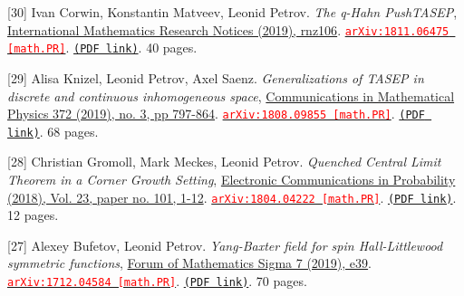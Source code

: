 \begin{etaremune}
\item[{[30]}] 
Ivan Corwin, Konstantin Matveev, Leonid Petrov.
\emph{The q-Hahn PushTASEP}, \href{https://doi.org/10.1093/imrn/rnz106}{International Mathematics Research Notices (2019),  rnz106}. 
\href{https://arxiv.org/abs/1811.06475}{\texttt{{\textcolor{red}{arXiv:1811.06475 [math.PR]}}}}. \href{https://storage.lpetrov.cc/papers/30-the_qhahn_pushtasep.pdf}{\texttt{(PDF link)}}. 40 pages.





\item[{[29]}] 
Alisa Knizel, Leonid Petrov, Axel Saenz.
\emph{Generalizations of TASEP in discrete and continuous inhomogeneous space}, \href{https://link.springer.com/article/10.1007%2Fs00220-019-03495-4}{Communications in Mathematical Physics 372 (2019), no. 3, pp 797-864}. 
\href{https://arxiv.org/abs/1808.09855}{\texttt{{\textcolor{red}{arXiv:1808.09855 [math.PR]}}}}. \href{https://storage.lpetrov.cc/papers/29-generalizations_of_tasep.pdf}{\texttt{(PDF link)}}. 68 pages.











\item[{[28]}] 
Christian Gromoll, Mark Meckes, Leonid Petrov.
\emph{Quenched Central Limit Theorem in a Corner Growth Setting}, \href{https://projecteuclid.org/euclid.ecp/1545188961}{Electronic Communications in Probability (2018), Vol. 23, paper no. 101, 1-12}. 
\href{https://arxiv.org/abs/1804.04222}{\texttt{{\textcolor{red}{arXiv:1804.04222 [math.PR]}}}}. \href{https://storage.lpetrov.cc/papers/28-quenched_central_limit.pdf}{\texttt{(PDF link)}}. 12 pages.













\item[{[27]}] 
Alexey Bufetov, Leonid Petrov.
\emph{Yang-Baxter field for spin Hall-Littlewood symmetric functions}, \href{https://doi.org/10.1017/fms.2019.36}{Forum of Mathematics Sigma 7 (2019), e39}. 
\href{https://arxiv.org/abs/1712.04584}{\texttt{{\textcolor{red}{arXiv:1712.04584 [math.PR]}}}}. \href{https://storage.lpetrov.cc/papers/27-yangbaxter_field_for.pdf}{\texttt{(PDF link)}}. 70 pages.














\end{etaremune}
